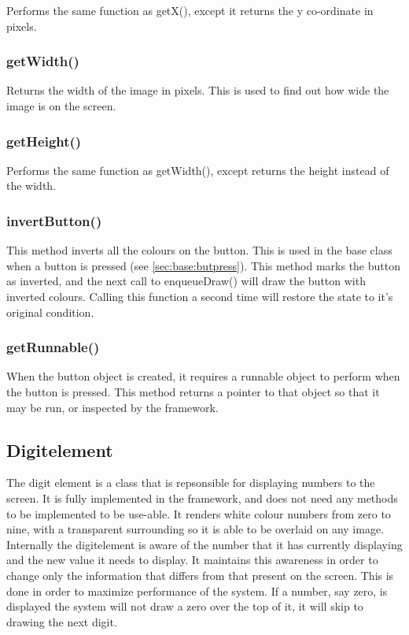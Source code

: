 Performs the same function as getX(), except it returns the y co-ordinate in pixels.

\subsubsection{getWidth()}

Returns the width of the image in pixels. This is used to find out how wide the image is on the screen.

\subsubsection{getHeight()}

Performs the same function as getWidth(), except returns the height instead of the width.

\subsubsection{invertButton()}

This method inverts all the colours on the button. This is used in the base class when a button is pressed (see \ref{sec:base:butpress}). This method marks the button as inverted, and the next call to enqueueDraw() will draw the button with inverted colours. Calling this function a second time will restore the state to it's original condition.

\subsubsection{getRunnable()}

When the button object is created, it requires a runnable object to perform when the button is pressed. This method returns a pointer to that object so that it may be run, or inspected by the framework.

\subsection{Digitelement}
\label{sec:digitelement}
The digit element is a class that is repsonsible for displaying numbers to the screen. It is fully implemented in the framework, and does not need any methods to be implemented to be use-able. It renders white colour numbers from zero to nine, with a transparent surrounding so it is able to be overlaid on any image. Internally the digitelement is aware of the number that it has currently displaying and the new value it needs to display. It maintains this awareness in order to change only the information that differs from that present on the screen. This is done in order to maximize performance of the system. If a number, say zero, is displayed the system will not draw a zero over the top of it, it will skip to drawing the next digit.

